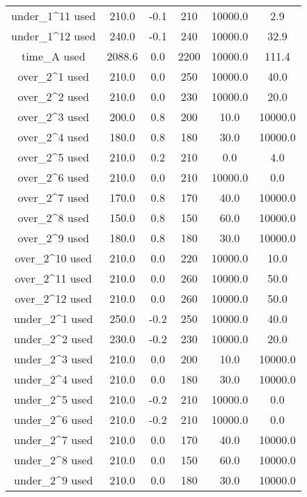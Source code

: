 \documentclass[
]{article}
\begin{document}
\begin{longtable}{cccccc}
under\_1\textasciicircum{}11 used & 210.0 & -0.1 & 210 & 10000.0 & 2.9\\
under\_1\textasciicircum{}12 used & 240.0 & -0.1 & 240 & 10000.0 & 32.9\\
\addlinespace
time\_A used & 2088.6 & 0.0 & 2200 & 10000.0 & 111.4\\
over\_2\textasciicircum{}1 used & 210.0 & 0.0 & 250 & 10000.0 & 40.0\\
over\_2\textasciicircum{}2 used & 210.0 & 0.0 & 230 & 10000.0 & 20.0\\
over\_2\textasciicircum{}3 used & 200.0 & 0.8 & 200 & 10.0 & 10000.0\\
over\_2\textasciicircum{}4 used & 180.0 & 0.8 & 180 & 30.0 & 10000.0\\
over\_2\textasciicircum{}5 used & 210.0 & 0.2 & 210 & 0.0 & 4.0\\
over\_2\textasciicircum{}6 used & 210.0 & 0.0 & 210 & 10000.0 & 0.0\\
over\_2\textasciicircum{}7 used & 170.0 & 0.8 & 170 & 40.0 & 10000.0\\
over\_2\textasciicircum{}8 used & 150.0 & 0.8 & 150 & 60.0 & 10000.0\\
over\_2\textasciicircum{}9 used & 180.0 & 0.8 & 180 & 30.0 & 10000.0\\
over\_2\textasciicircum{}10 used & 210.0 & 0.0 & 220 & 10000.0 & 10.0\\
over\_2\textasciicircum{}11 used & 210.0 & 0.0 & 260 & 10000.0 & 50.0\\
over\_2\textasciicircum{}12 used & 210.0 & 0.0 & 260 & 10000.0 & 50.0\\
under\_2\textasciicircum{}1 used & 250.0 & -0.2 & 250 & 10000.0 & 40.0\\
\addlinespace
under\_2\textasciicircum{}2 used & 230.0 & -0.2 & 230 & 10000.0 & 20.0\\
under\_2\textasciicircum{}3 used & 210.0 & 0.0 & 200 & 10.0 & 10000.0\\
under\_2\textasciicircum{}4 used & 210.0 & 0.0 & 180 & 30.0 & 10000.0\\
under\_2\textasciicircum{}5 used & 210.0 & -0.2 & 210 & 10000.0 & 0.0\\
under\_2\textasciicircum{}6 used & 210.0 & -0.2 & 210 & 10000.0 & 0.0\\
\addlinespace
under\_2\textasciicircum{}7 used & 210.0 & 0.0 & 170 & 40.0 & 10000.0\\
under\_2\textasciicircum{}8 used & 210.0 & 0.0 & 150 & 60.0 & 10000.0\\
under\_2\textasciicircum{}9 used & 210.0 & 0.0 & 180 & 30.0 & 10000.0\\

\end{longtable}
\end{document}
